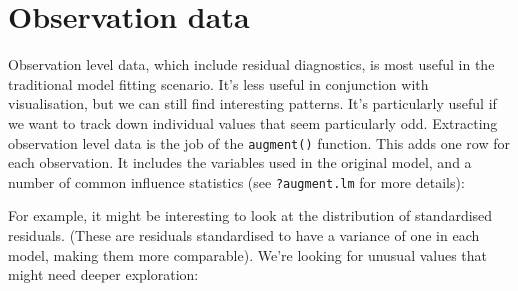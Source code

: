 \section{Observation data}

Observation level data, which include residual diagnostics, is most
useful in the traditional model fitting scenario. It's less useful in
conjunction with visualisation, but we can still find interesting
patterns. It's particularly useful if we want to track down individual
values that seem particularly odd. Extracting observation level data is
the job of the \texttt{augment()} function. This adds one row for each
observation. It includes the variables used in the original model, and a
number of common influence statistics (see \texttt{?augment.lm} for more
details): 

\begin{Shaded}
\end{Shaded}

For example, it might be interesting to look at the distribution of
standardised residuals. (These are residuals standardised to have a
variance of one in each model, making them more comparable). We're
looking for unusual values that might need deeper exploration:

\begin{Shaded}
\begin{Highlighting}[]
\StringTok{ }
\StringTok{  }\NormalTok{(} \NormalTok{)}
\NormalTok{(}\StringTok{ }
\StringTok{  }\NormalTok{(} \NormalTok{)}
\end{Highlighting}
\end{Shaded}

